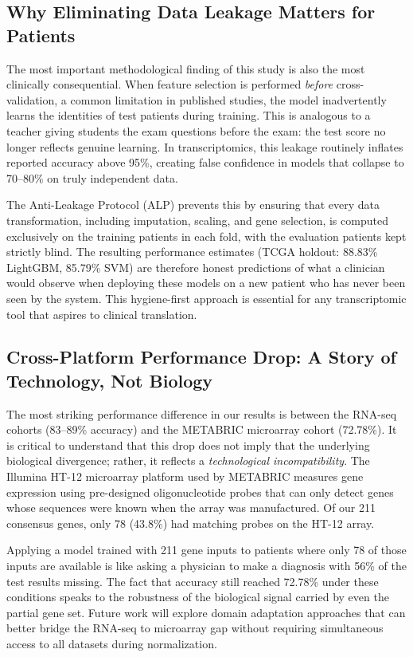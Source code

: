 \documentclass[10pt,a4paper,twocolumn]{article}
\begin{document}
\subsection{Why Eliminating Data Leakage Matters for Patients}

The most important methodological finding of this study is also the most clinically consequential. When feature selection is performed \textit{before} cross-validation, a common limitation in published studies, the model inadvertently learns the identities of test patients during training. This is analogous to a teacher giving students the exam questions before the exam: the test score no longer reflects genuine learning. In transcriptomics, this leakage routinely inflates reported accuracy above 95\%, creating false confidence in models that collapse to 70--80\% on truly independent data.

The Anti-Leakage Protocol (ALP) prevents this by ensuring that every data transformation, including imputation, scaling, and gene selection, is computed exclusively on the training patients in each fold, with the evaluation patients kept strictly blind. The resulting performance estimates (TCGA holdout: 88.83\% LightGBM, 85.79\% SVM) are therefore honest predictions of what a clinician would observe when deploying these models on a new patient who has never been seen by the system. This hygiene-first approach is essential for any transcriptomic tool that aspires to clinical translation.

\subsection{Cross-Platform Performance Drop: A Story of Technology, Not Biology}

The most striking performance difference in our results is between the RNA-seq cohorts (83--89\% accuracy) and the METABRIC microarray cohort (72.78\%). It is critical to understand that this drop does not imply that the underlying biological divergence; rather, it reflects a \textit{technological incompatibility}. The Illumina HT-12 microarray platform used by METABRIC measures gene expression using pre-designed oligonucleotide probes that can only detect genes whose sequences were known when the array was manufactured. Of our 211 consensus genes, only 78 (43.8\%) had matching probes on the HT-12 array.

Applying a model trained with 211 gene inputs to patients where only 78 of those inputs are available is like asking a physician to make a diagnosis with 56\% of the test results missing. The fact that accuracy still reached 72.78\% under these conditions speaks to the robustness of the biological signal carried by even the partial gene set. Future work will explore domain adaptation approaches that can better bridge the RNA-seq to microarray gap without requiring simultaneous access to all datasets during normalization.
\end{document}
